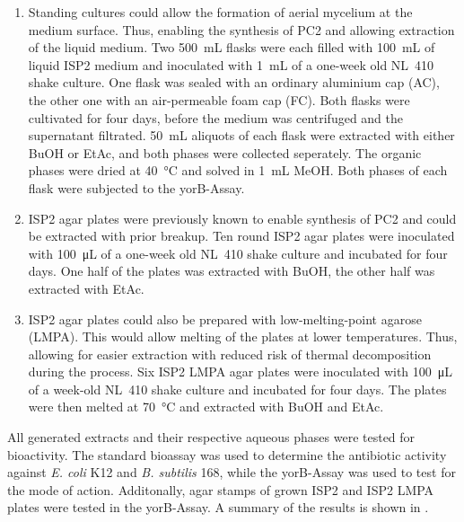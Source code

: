     \begin{enumerate}
        \item
	        Standing cultures could allow the formation of aerial mycelium at the medium surface.
	        Thus, enabling the synthesis of PC2 and allowing extraction of the liquid medium.
	        Two \SI{500}{\milli\liter} flasks were each filled with \SI{100}{\milli\liter} of liquid ISP2 medium and inoculated with \SI{1}{\milli\liter} of a one-week old NL~410 shake culture.
	        One flask was sealed with an ordinary aluminium cap (AC), the other one with an air-permeable foam cap (FC).
	        Both flasks were cultivated for four days, before the medium was centrifuged and the supernatant filtrated.
	        \SI{50}{\milli\liter} aliquots of each flask were extracted with either BuOH or EtAc, and both phases were collected seperately.
	        The organic phases were dried at \SI{40}{\celsius} and solved in \SI{1}{\milli\liter} MeOH.
	        Both phases of each flask were subjected to the yorB-Assay.
        \item
	        ISP2 agar plates were previously known to enable synthesis of PC2 and could be extracted with prior breakup.
	        Ten round ISP2 agar plates were inoculated with \SI{100}{\micro\liter} of a one-week old NL~410 shake culture and incubated for four days.
	        One half of the plates was extracted with BuOH, the other half was extracted with EtAc.
        \item
	        ISP2 agar plates could also be prepared with low-melting-point agarose (LMPA).
	        This would allow melting of the plates at lower temperatures.
	        Thus, allowing for easier extraction with reduced risk of thermal decomposition during the process.
	        Six ISP2 LMPA agar plates were inoculated with \SI{100}{\micro\liter} of a week-old NL~410 shake culture and incubated for four days.
	        The plates were then melted at \SI{70}{\celsius} and extracted with BuOH and EtAc.
    \end{enumerate}

    All generated extracts and their respective aqueous phases were tested for bioactivity.
    The standard bioassay was used to determine the antibiotic activity against \textit{E. coli} K12 and \textit{B. subtilis} 168, while the yorB-Assay was used to test for the mode of action.
    Additonally, agar stamps of grown ISP2 and ISP2 LMPA plates were tested in the yorB-Assay.
    A summary of the results is shown in .


